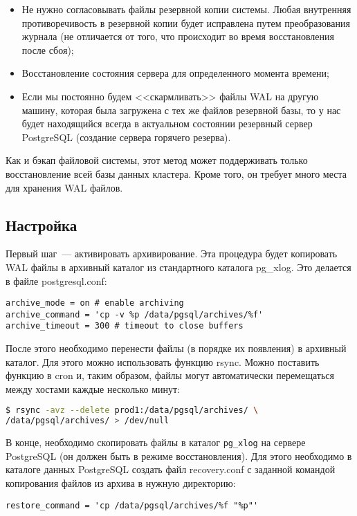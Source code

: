 \begin{itemize}
  \item Не нужно согласовывать файлы резервной копии системы. Любая внутренняя противоречивость в резервной копии будет исправлена путем преобразования журнала (не отличается от того, что происходит во время восстановления после сбоя);
  \item Восстановление состояния сервера для определенного момента времени;
  \item Если мы постоянно будем <<скармливать>> файлы WAL на другую машину, которая была загружена с тех же файлов резервной базы, то у нас будет находящийся всегда в актуальном состоянии резервный сервер PostgreSQL (создание сервера горячего резерва).
\end{itemize}

Как и бэкап файловой системы, этот метод может поддерживать только восстановление всей базы данных кластера. Кроме того, он требует много места для хранения WAL файлов.

\subsection{Настройка}

Первый шаг~--- активировать архивирование. Эта процедура будет копировать WAL файлы в архивный каталог из стандартного каталога pg\_xlog. Это делается в файле postgresql.conf:

\begin{lstlisting}[label=lst:backups15,caption=Настройка архивирования]
archive_mode = on # enable archiving
archive_command = 'cp -v %p /data/pgsql/archives/%f'
archive_timeout = 300 # timeout to close buffers
\end{lstlisting}

После этого необходимо перенести файлы (в порядке их появления) в архивный каталог. Для этого можно использовать функцию rsync. Можно поставить функцию в cron и, таким образом, файлы могут автоматически перемещаться между хостами каждые несколько минут:

\begin{lstlisting}[language=Bash,label=lst:backups16,caption=Копирование WAL файлов на другой хост]
$ rsync -avz --delete prod1:/data/pgsql/archives/ \
/data/pgsql/archives/ > /dev/null
\end{lstlisting}

В конце, необходимо скопировать файлы в каталог \lstinline!pg_xlog! на сервере PostgreSQL (он должен быть в режиме восстановления). Для этого необходимо в каталоге данных PostgreSQL создать файл recovery.conf с заданной командой копирования файлов из архива в нужную директорию:
\begin{lstlisting}[label=lst:backups17,caption=recovery.conf]
restore_command = 'cp /data/pgsql/archives/%f "%p"'
\end{lstlisting}

